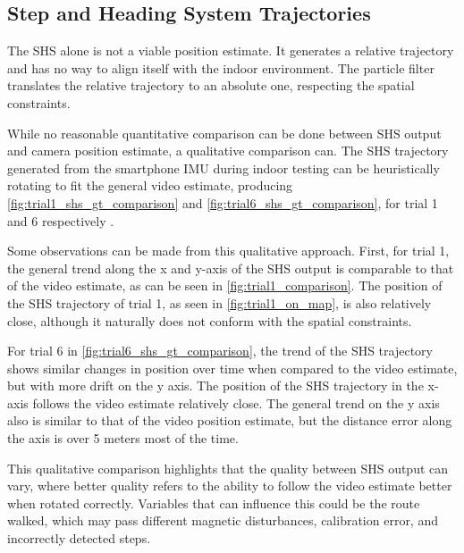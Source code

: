 \subsection{Step and Heading System Trajectories}
\label{sec:results-SHS_trajectories}
The \acl{SHS} alone is not a viable position estimate. It generates a relative trajectory and has no way to align itself with the indoor environment. The particle filter translates the relative trajectory to an absolute one, respecting the spatial constraints.\par 

While no reasonable quantitative comparison can be done between \ac{SHS} output and camera position estimate, a qualitative comparison can. The SHS trajectory generated from the smartphone IMU during indoor testing can be heuristically rotating to fit the general video estimate, producing \cref{fig:trial1_shs_gt_comparison} and \cref{fig:trial6_shs_gt_comparison}, for trial 1 and 6 respectively .\par 

Some observations can be made from this qualitative approach. First, for trial 1, the general trend along the x and y-axis of the SHS output is comparable to that of the video estimate, as can be seen in \cref{fig:trial1_comparison}. The position of the SHS trajectory of trial 1, as seen in \cref{fig:trial1_on_map}, is also relatively close, although it naturally does not conform with the spatial constraints. \par 
For trial 6 in \cref{fig:trial6_shs_gt_comparison}, the trend of the SHS trajectory shows similar changes in position over time when compared to the video estimate, but with more drift on the y axis. The position of the SHS trajectory in the x-axis follows the video estimate relatively close. The general trend on the y axis also is similar to that of the video position estimate, but the distance error along the axis is over 5 meters most of the time. \par 

This qualitative comparison highlights that the quality between SHS output can vary, where better quality refers to the ability to follow the video estimate better when rotated correctly. Variables that can influence this could be the route walked, which may pass different magnetic disturbances, calibration error, and incorrectly detected steps.

